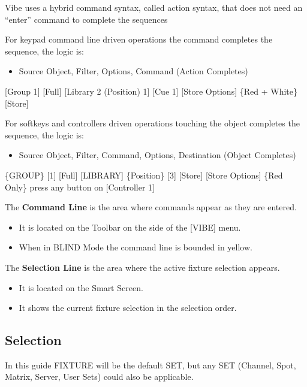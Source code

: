 \documentclass[
]{article}
\providecommand{\tightlist}{%
  \setlength{\itemsep}{0pt}\setlength{\parskip}{0pt}}
\begin{document}
Vibe uses a hybrid command syntax, called action syntax, that does not need an ``enter'' command to complete the sequences

For keypad command line driven operations the command completes the sequence, the logic is:

\begin{itemize}
\tightlist
\item
  Source Object, Filter, Options, Command (Action Completes)
\end{itemize}

{[}Group 1{]} {[}Full{]} {[}Library 2 (Position) 1{]} {[}Cue 1{]} {[}Store Options{]} \{Red + White\} {[}Store{]}

For softkeys and controllers driven operations touching the object completes the sequence, the logic is:

\begin{itemize}
\tightlist
\item
  Source Object, Filter, Command, Options, Destination (Object Completes)
\end{itemize}

\{GROUP\} {[}1{]} {[}Full{]} {[}LIBRARY{]} \{Position\} {[}3{]} {[}Store{]} {[}Store Options{]} \{Red Only\} press any button on {[}Controller 1{]}

The \textbf{Command Line} is the area where commands appear as they are entered.

\begin{itemize}
\item
  It is located on the Toolbar on the side of the {[}VIBE{]} menu.
\item
  When in BLIND Mode the command line is bounded in yellow.
\end{itemize}

The \textbf{Selection Line} is the area where the active fixture selection appears.

\begin{itemize}
\item
  It is located on the Smart Screen.
\item
  It shows the current fixture selection in the selection order.
\end{itemize}

\hypertarget{Selection-6.3}{%
\subsection{Selection}\label{Selection-6.3}}

In this guide FIXTURE will be the default SET, but any SET (Channel, Spot, Matrix, Server, User Sets) could also be applicable.
\end{document}
